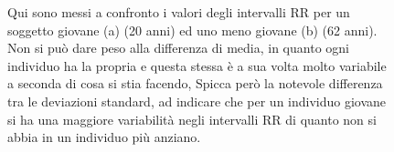 \documentclass[12pt,a4paper, twoside, openright]{report}
\begin{document}
\begin{figure}[h!]
	\centering
	\hfill
	\caption{Qui sono messi a confronto i valori degli intervalli RR per un soggetto giovane (a) (20 anni) ed uno meno giovane (b) (62 anni).
	Non si può dare peso alla differenza di media, in quanto ogni individuo ha la propria e questa stessa è a sua volta molto variabile a seconda di cosa si stia facendo, Spicca però la notevole differenza tra le deviazioni standard, ad indicare che per un individuo giovane si ha una maggiore variabilità negli intervalli RR di quanto non si abbia in un individuo più anziano.}
	\label{fig:RR_y_vs_o}
\end{figure}
\end{document}
